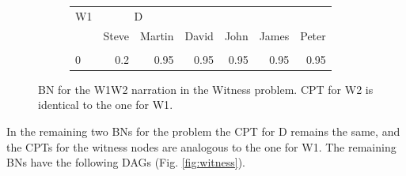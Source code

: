 \documentclass[
  10pt,
]{scrartcl}
\begin{document}
\begin{figure}[H]
\centering
\begin{subfigure}[!ht]{0.3\textwidth}
\begin{tabular}{lrrrrrr}
\toprule
\multicolumn{1}{c}{W1} & \multicolumn{2}{c}{D} \\
  & Steve & Martin & David & John & James & Peter\\
\midrule
\cellcolor{gray!6}{1} & \cellcolor{gray!6}{0.8} & \cellcolor{gray!6}{0.05} & \cellcolor{gray!6}{0.05} & \cellcolor{gray!6}{0.05} & \cellcolor{gray!6}{0.05} & \cellcolor{gray!6}{0.05}\\
0 & 0.2 & 0.95 & 0.95 & 0.95 & 0.95 & 0.95\\
\bottomrule
\end{tabular}
\end{subfigure}
\caption{BN for the \textsf{W1W2} narration in the \textsf{Witness} problem. CPT for \textsf{W2} is identical to the one for \textsf{W1}.}
\label{fig:w1w2}
\end{figure}

In the remaining two BNs for the problem the CPT for \textsf{D} remains the same, and the CPTs for the witness nodes are analogous to the one for \textsf{W1}. The remaining BNs have the following DAGs (Fig. \ref{fig:witness}).
\end{document}
